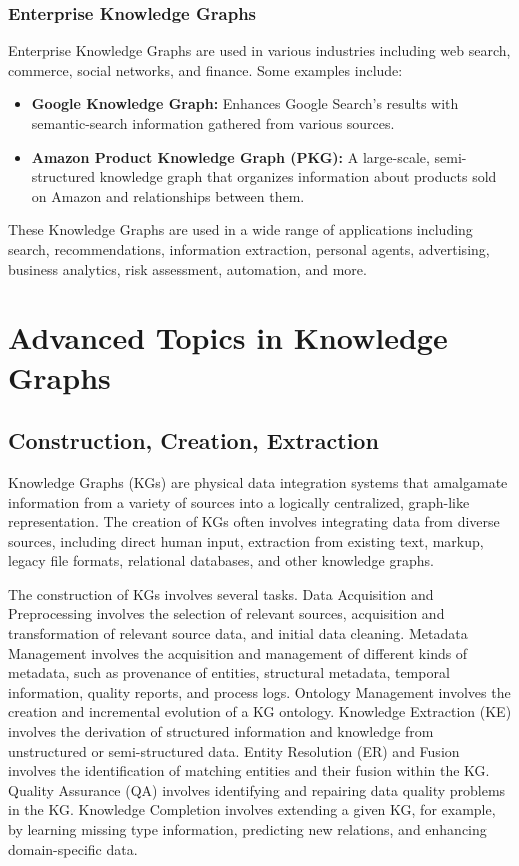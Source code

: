 \documentclass[11pt]{article} %
\begin{document}
\subsubsection*{Enterprise Knowledge Graphs}

Enterprise Knowledge Graphs are used in various industries including web search, commerce, social networks, and finance. Some examples include:

\begin{itemize}
    \item \textbf{Google Knowledge Graph:} Enhances Google Search's results with semantic-search information gathered from various sources.
    \item \textbf{Amazon Product Knowledge Graph (PKG):} A large-scale, semi-structured knowledge graph that organizes information about products sold on Amazon and relationships between them.
\end{itemize}

These Knowledge Graphs are used in a wide range of applications including search, recommendations, information extraction, personal agents, advertising, business analytics, risk assessment, automation, and more.

\section{Advanced Topics in Knowledge Graphs}

\subsection{Construction, Creation, Extraction}

Knowledge Graphs (KGs) are physical data integration systems that amalgamate information from a variety of sources into a logically centralized, graph-like representation. The creation of KGs often involves integrating data from diverse sources, including direct human input, extraction from existing text, markup, legacy file formats, relational databases, and other knowledge graphs. 

The construction of KGs involves several tasks. Data Acquisition and Preprocessing involves the selection of relevant sources, acquisition and transformation of relevant source data, and initial data cleaning. Metadata Management involves the acquisition and management of different kinds of metadata, such as provenance of entities, structural metadata, temporal information, quality reports, and process logs. Ontology Management involves the creation and incremental evolution of a KG ontology. Knowledge Extraction (KE) involves the derivation of structured information and knowledge from unstructured or semi-structured data. Entity Resolution (ER) and Fusion involves the identification of matching entities and their fusion within the KG. Quality Assurance (QA) involves identifying and repairing data quality problems in the KG. Knowledge Completion involves extending a given KG, for example, by learning missing type information, predicting new relations, and enhancing domain-specific data.
\end{document}
